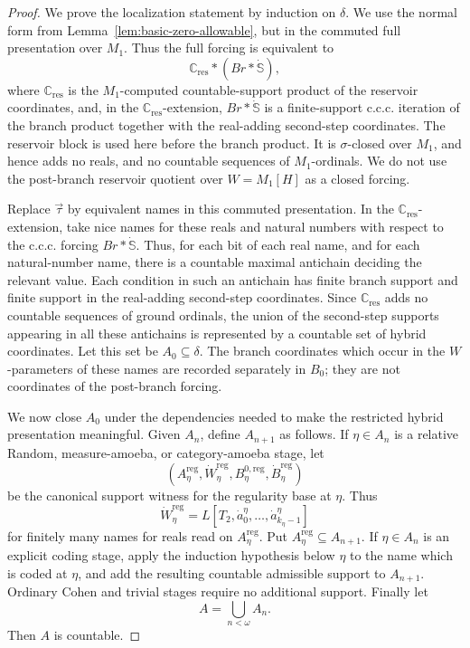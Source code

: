 \documentclass[a4paper,11pt]{article}
\begin{document}
\begin{proof}
We prove the localization statement by induction on \(\delta\).  We use the
normal form from Lemma~\ref{lem:basic-zero-allowable}, but in the commuted full
presentation over \(M_1\).  Thus the full forcing is equivalent to
\[
   \mathbb C_{\mathrm{res}}*(Br*\dot{\mathbb S}),
\]
where \(\mathbb C_{\mathrm{res}}\) is the \(M_1\)-computed countable-support
product of the reservoir coordinates, and, in the \(\mathbb C_{\mathrm{res}}\)-extension,
\(Br*\dot{\mathbb S}\) is a finite-support c.c.c. iteration of the branch
product together with the real-adding second-step coordinates.  The reservoir
block is used here before the branch product.  It is \(\sigma\)-closed over
\(M_1\), and hence adds no reals, and no countable sequences of
\(M_1\)-ordinals.  We do not use the post-branch reservoir quotient over
\(W=M_1[H]\) as a closed forcing.

Replace \(\vec\tau\) by equivalent names in this commuted presentation.  In the
\(\mathbb C_{\mathrm{res}}\)-extension, take nice names for these reals and
natural numbers with respect to the c.c.c. forcing \(Br*\dot{\mathbb S}\).  Thus,
for each bit of each real name, and for each natural-number name, there is a
countable maximal antichain deciding the relevant value.  Each condition in
such an antichain has finite branch support and finite support in the
real-adding second-step coordinates.  Since \(\mathbb C_{\mathrm{res}}\) adds no
countable sequences of ground ordinals, the union of the second-step supports
appearing in all these antichains is represented by a countable set of hybrid
coordinates.  Let this set be \(A_0\subseteq\delta\).  The branch coordinates
which occur in the \(W\)-parameters of these names are recorded separately in
\(B_0\); they are not coordinates of the post-branch forcing.

We now close \(A_0\) under the dependencies needed to make the restricted
hybrid presentation meaningful.  Given \(A_n\), define \(A_{n+1}\) as follows.
If \(\eta\in A_n\) is a relative Random, measure-amoeba, or category-amoeba
stage, let
\[
   (A^{\mathrm{reg}}_\eta,
    \dot W^{\mathrm{reg}}_\eta,
    B^{0,\mathrm{reg}}_\eta,
    \dot B^{\mathrm{reg}}_\eta)
\]
be the canonical support witness for the regularity base at \(\eta\).  Thus
\[
   \dot W^{\mathrm{reg}}_\eta
      =L[T_2,\dot a^\eta_0,
             \ldots,\dot a^\eta_{k_\eta-1}]
\]
for finitely many names for reals read on
\(A^{\mathrm{reg}}_\eta\).  Put \(A^{\mathrm{reg}}_\eta\subseteq A_{n+1}\).
If \(\eta\in A_n\) is an explicit coding stage, apply the induction hypothesis
below \(\eta\) to the name which is coded at \(\eta\), and add the resulting
countable admissible support to \(A_{n+1}\).  Ordinary Cohen and trivial stages
require no additional support.  Finally let
\[
   A=\bigcup_{n<\omega}A_n.
\]
Then \(A\) is countable.


\end{proof}
\end{document}
